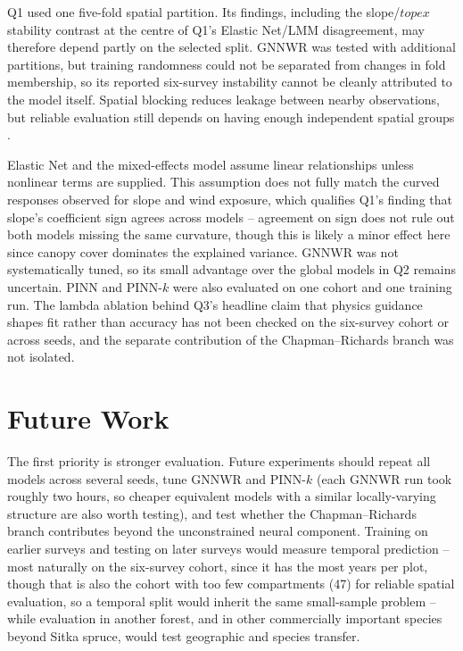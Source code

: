 \documentclass[logo,msc,ai]{infthesis}           %
\begin{document}
Q1 used one five-fold spatial partition. Its findings, including the slope/$\mathit{topex}$ stability contrast at the centre of Q1's Elastic Net/LMM disagreement, may therefore depend partly on the selected split. GNNWR was tested with additional partitions, but training randomness could not be separated from changes in fold membership, so its reported six-survey instability cannot be cleanly attributed to the model itself. Spatial blocking reduces leakage between nearby observations, but reliable evaluation still depends on having enough independent spatial groups \cite{roberts2017Cross_C5_EVAL,ploton2020Spatial_C5_EVAL}.

Elastic Net and the mixed-effects model assume linear relationships unless nonlinear terms are supplied. This assumption does not fully match the curved responses observed for slope and wind exposure, which qualifies Q1's finding that slope's coefficient sign agrees across models -- agreement on sign does not rule out both models missing the same curvature, though this is likely a minor effect here since canopy cover dominates the explained variance. GNNWR was not systematically tuned, so its small advantage over the global models in Q2 remains uncertain. PINN and PINN-$k$ were also evaluated on one cohort and one training run. The lambda ablation behind Q3's headline claim that physics guidance shapes fit rather than accuracy has not been checked on the six-survey cohort or across seeds, and the separate contribution of the Chapman--Richards branch was not isolated.

\section{Future Work}

The first priority is stronger evaluation. Future experiments should repeat all models across several seeds, tune GNNWR and PINN-$k$ (each GNNWR run took roughly two hours, so cheaper equivalent models with a similar locally-varying structure are also worth testing), and test whether the Chapman--Richards branch contributes beyond the unconstrained neural component. Training on earlier surveys and testing on later surveys would measure temporal prediction -- most naturally on the six-survey cohort, since it has the most years per plot, though that is also the cohort with too few compartments (47) for reliable spatial evaluation, so a temporal split would inherit the same small-sample problem -- while evaluation in another forest, and in other commercially important species beyond Sitka spruce, would test geographic and species transfer.
\end{document}
